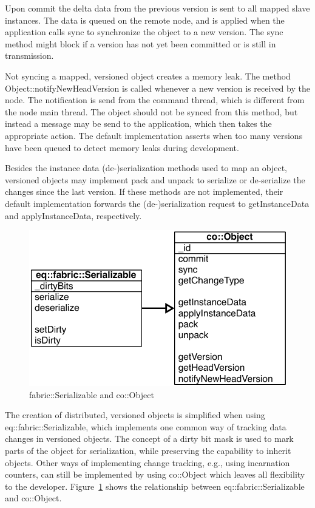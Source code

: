 \documentclass[10pt,a4]{scrartcl}
\newcommand{\fig}[1]{Figure~\ref{#1}}
\begin{document}
Upon \textsf{commit} the delta data from the previous version is sent to
all mapped slave instances. The data is queued on the remote node, and
is applied when the application calls \textsf{sync} to synchronize the
object to a new version. The \textsf{sync} method might block if a
version has not yet been committed or is still in transmission.

Not syncing a mapped, versioned object creates a memory leak. The method
\textsf{Object::notifyNewHeadVersion} is called whenever a new version
is received by the node. The notification is send from the command
thread, which is different from the node main thread. The object should
not be synced from this method, but instead a message may be send to the
application, which then takes the appropriate action. The default
implementation asserts when too many versions have been queued
to detect memory leaks during development.

Besides the instance data (de-)serialization methods used to map an
object, versioned objects may implement \textsf{pack} and
\textsf{unpack} to serialize or de-serialize the changes since the last
version. If these methods are not implemented, their default
implementation forwards the (de-)serialization request to
\textsf{getInstanceData} and \textsf{applyInstanceData}, respectively.

\begin{figure}
  \includegraphics[width=.382\textwidth]{images/umlObject.pdf}
  {\caption{\label{fUMLObject}fabric::Serializable and co::Object}}
\end{figure}
The creation of distributed, versioned objects is simplified when using
\textsf{eq::fabric::Serializable}, which implements one common way of tracking
data changes in versioned objects. The concept of a dirty bit mask is used to
mark parts of the object for serialization, while preserving the capability to
inherit objects. Other ways of implementing change tracking, e.g., using
incarnation counters, can still be implemented by using \textsf{co::Object}
which leaves all flexibility to the developer. \fig{fUMLObject} shows the
relationship between \textsf{eq::fabric::Serializable} and \textsf{co::Object}.
\end{document}
